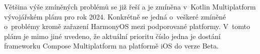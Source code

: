 Většina výše zmíněných problémů se již řeší a je zmíněna v~Kotlin Multiplatform vývojářském plánu pro rok 2024. \cite{KMPRoaddMap} Konkrétně
se jedná o~veškeré zmíněné o~problémy kromě zařazení HarmonyOS mezi podporované platformy.%
V~tomto plánu je mimo jiné uvedeno, že aktuální prioritu číslo jedna je dostání frameworku Compose Multiplatform na platformě iOS do verze Beta. \cite{KMPRoaddMap}

